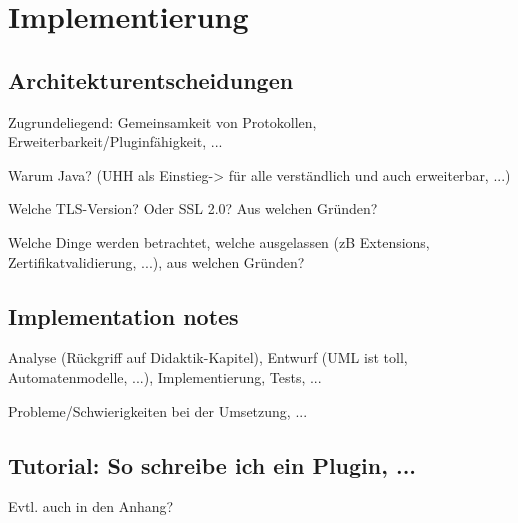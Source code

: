\chapter{Implementierung}

\section{Architekturentscheidungen}

Zugrundeliegend: Gemeinsamkeit von Protokollen, Erweiterbarkeit/Pluginfähigkeit, ...

Warum Java? (UHH als Einstieg-> für alle verständlich und auch erweiterbar, ...)

Welche TLS-Version? Oder SSL 2.0? Aus welchen Gründen?

Welche Dinge werden betrachtet, welche ausgelassen (zB Extensions, Zertifikatvalidierung, ...), aus welchen Gründen?

\section{Implementation notes}

Analyse (Rückgriff auf Didaktik-Kapitel), Entwurf (UML ist toll, Automatenmodelle, ...), Implementierung, Tests, ...

Probleme/Schwierigkeiten bei der Umsetzung, ...

\section{Tutorial: So schreibe ich ein Plugin, ...}

Evtl. auch in den Anhang?
